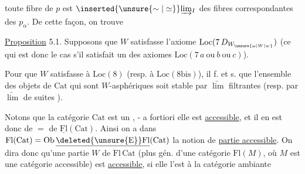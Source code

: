 toute fibre de $p$ est $\inserted{\unsure{\sim|\simeq}}\underrightarrow{\lim}_{I}$ des fibres correspondantes des $p_\alpha$. De cette façon, on trouve

\uline{Proposition} 5.1. Supposons que $W$ satisfasse l'axiome  $\mathrm{Loc}(7\,D_{W_{\unsure{\omega|W|w}}})$ (ce qui est donc le cas s'il satisfait un des axiomes  $\mathrm{Loc}(7\,a\ \text{ou}\ b\ \text{ou}\ c)$).

Pour que $W$ satisfasse à $\mathrm{Loc}(8)$ (resp. à $\mathrm{Loc}(8\mathrm{bis})$), il f. et s.   que l'ensemble des objets de $\mathrm{Cat}$ qui sont $W$-asphériques soit stable par $\underrightarrow{\lim}$ filtrantes (resp. par $\underrightarrow{\lim}$  de suites ).

  Notons que la catégorie $\mathrm{Cat}$ est un , - a fortiori elle est \uline{accessible},  et il en est donc de $=$ de $\underline{\mathrm{Fl}}(\mathrm{Cat})$. Ainsi on a dans $\mathrm{Fl}(\mathrm{Cat})=\mathrm{Ob}\,\underline{\deleted{\unsure{\mathrm{E}}}\mathrm{Fl}}(\mathrm{Cat})$ la notion
de \uline{partie accessible}. On dira donc qu'une partie $W$ de $\mathrm{Fl}\,\mathrm{Cat}$ (plus gén. d'une catégorie $\mathrm{Fl}(M)$, où $M$ est une catégorie accessible) est \uline{accessible}, si elle l'est   à la catégorie ambiante
